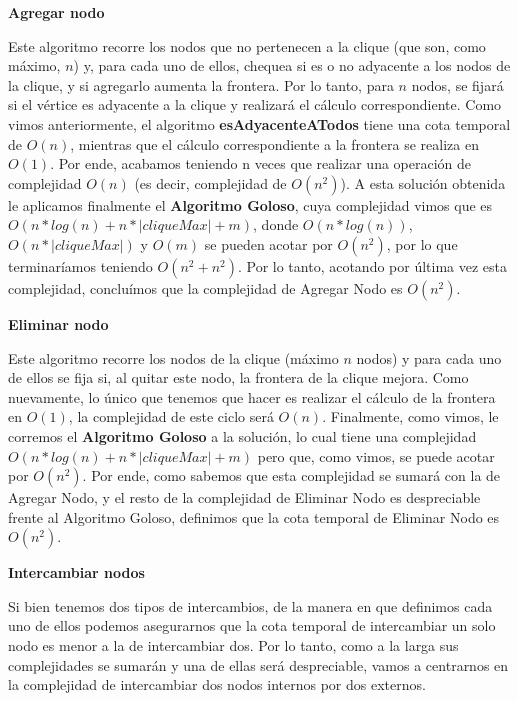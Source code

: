 \begin{center}
	\textbf{Agregar nodo}
\end{center}
Este algoritmo recorre los nodos que no pertenecen a la clique (que son, como máximo, $n$) y, para cada uno de ellos, chequea si es o no adyacente a los nodos de la clique, y si agregarlo aumenta la frontera. Por lo tanto, para $n$ nodos, se fijará si el vértice es adyacente a la clique y realizará el cálculo correspondiente. Como vimos anteriormente, el algoritmo \textbf{esAdyacenteATodos} tiene una cota temporal de $O(n)$, mientras que el cálculo correspondiente a la frontera se realiza en $O(1)$. Por ende, acabamos teniendo n veces que realizar una operación de complejidad $O(n)$ (es decir, complejidad de $O(n^2)$). A esta solución obtenida le aplicamos finalmente el \textbf{Algoritmo Goloso}, cuya complejidad vimos que es $O( n*log(n) + n*|cliqueMax| + m)$, donde $O(n*log(n))$, $O(n*|cliqueMax|)$ y $O(m)$ se pueden acotar por $O(n^2)$, por lo que terminaríamos teniendo $O(n^2 + n^2)$. Por lo tanto, acotando por última vez esta complejidad, concluímos que la complejidad de Agregar Nodo es $O(n^2)$.

\begin{center}
	\textbf{Eliminar nodo}
\end{center}
Este algoritmo recorre los nodos de la clique (máximo $n$ nodos) y para cada uno de ellos se fija si, al quitar este nodo, la frontera de la clique mejora. Como nuevamente, lo único que tenemos que hacer es realizar el cálculo de la frontera en $O(1)$, la complejidad de este ciclo será $O(n)$. Finalmente, como vimos, le corremos el \textbf{Algoritmo Goloso} a la solución, lo cual tiene una complejidad $O( n*log(n) + n*|cliqueMax| + m)$ pero que, como vimos, se puede acotar por $O(n^2)$. Por ende, como sabemos que esta complejidad se sumará con la de Agregar Nodo, y el resto de la complejidad de Eliminar Nodo es despreciable frente al Algoritmo Goloso, definimos que la cota temporal de Eliminar Nodo es $O(n^2)$.

\begin{center}
	\textbf{Intercambiar nodos}
\end{center}
Si bien tenemos dos tipos de intercambios, de la manera en que definimos cada uno de ellos podemos asegurarnos que la cota temporal de intercambiar un solo nodo es menor a la de intercambiar dos. Por lo tanto, como a la larga sus complejidades se sumarán y una de ellas será despreciable, vamos a centrarnos en la complejidad de intercambiar dos nodos internos por dos externos.

